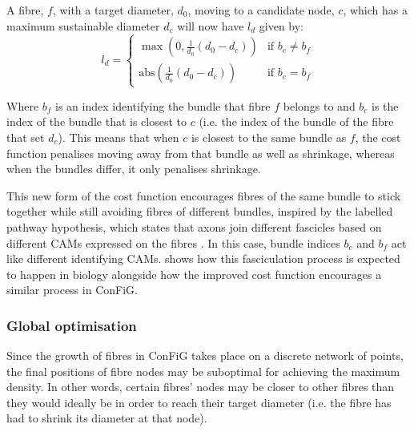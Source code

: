 A fibre, $f$, with a target diameter, $d_0$, moving to a candidate node, $c$, which has a maximum sustainable diameter $d_c$ will now have $l_d$ given by:
\begin{equation}
  \label{eq:updated_ld}
  l_d = \begin{cases}
    \max\left(0, \frac{1}{d_0} \left(d_0 - d_c\right)\right) & \text{if } b_c \neq b_f \\
    \mathrm{abs}\left(\frac{1}{d_0} \left(d_0 - d_c\right)\right) & \text{if } b_c = b_f
    \end{cases}
\end{equation}

Where $b_f$ is an index identifying the bundle that fibre $f$ belongs to and $b_c$ is the index of the bundle that is closest to $c$ (i.e. the index of the bundle of the fibre that set $d_c$). This means that when $c$ is closest to the same bundle as $f$, the cost function penalises moving away from that bundle as well as shrinkage, whereas when the bundles differ, it only penalises shrinkage.

This new form of the cost function encourages fibres of the same bundle to stick together while still avoiding fibres of different bundles, inspired by the labelled pathway hypothesis, which states that axons join different fascicles based on different \acp{CAM} expressed on the fibres \cite{Price2017}. In this case, bundle indices $b_c$ and $b_f$ act like different identifying \acp{CAM}.  shows how this fasciculation process is expected to happen in biology alongside how the improved cost function encourages a similar process in \ac{ConFiG}.

\subsubsection{Global optimisation}
\label{sec:config_global_optimisation}
Since the growth of fibres in \ac{ConFiG} takes place on a discrete network of points, the final positions of fibre nodes may be suboptimal for achieving the maximum density. In other words, certain fibres’ nodes may be closer to other fibres than they would ideally be in order to reach their target diameter (i.e. the fibre has had to shrink its diameter at that node).

